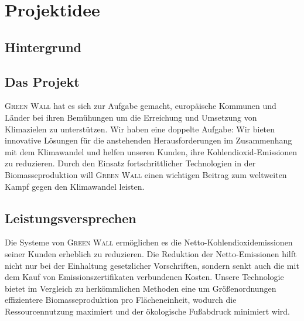 \chapter{Projektidee}

    \section{Hintergrund}

    \section{Das Projekt}
        \textsc{Green Wall} hat es sich zur Aufgabe gemacht, europäische Kommunen und Länder bei ihren Bemühungen um die Erreichung und Umsetzung von Klimazielen zu unterstützen.
        Wir haben eine doppelte Aufgabe: Wir bieten innovative Lösungen für die anstehenden Herausforderungen im Zusammenhang mit dem Klimawandel und helfen unseren Kunden, ihre Kohlendioxid-Emissionen zu reduzieren.
        Durch den Einsatz fortschrittlicher Technologien in der Biomasseproduktion will \textsc{Green Wall} einen wichtigen Beitrag zum weltweiten Kampf gegen den Klimawandel leisten.

    \section{Leistungsversprechen}
        Die Systeme von \textsc{Green Wall} ermöglichen es die Netto-Kohlendioxidemissionen seiner Kunden erheblich zu reduzieren.
        Die Reduktion der Netto-Emissionen hilft nicht nur bei der Einhaltung gesetzlicher Vorschriften, sondern senkt auch die mit dem Kauf von Emissionszertifikaten verbundenen Kosten.
        Unsere Technologie bietet im Vergleich zu herkömmlichen Methoden eine um Größenordnungen effizientere Biomasseproduktion pro Flächeneinheit, wodurch die Ressourcennutzung maximiert und der ökologische Fußabdruck minimiert wird.

